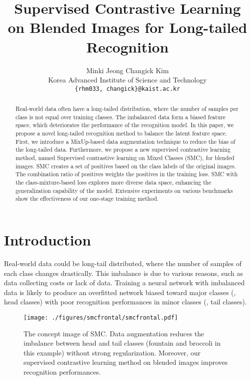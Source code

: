 \documentclass[10pt,twocolumn,letterpaper]{article}
\begin{document}
\title{Supervised Contrastive Learning on Blended Images for Long-tailed Recognition}

\author{Minki Jeong \quad Changick Kim\\
Korea Advanced Institute of Science and Technology\\
{\tt\small \{rhm033, changick\}@kaist.ac.kr}
}
\maketitle

\begin{abstract}
Real-world data often have a long-tailed distribution, where the number of samples per class is not equal over training classes. The imbalanced data form a biased feature space, which deteriorates the performance of the recognition model. In this paper, we propose a novel long-tailed recognition method to balance the latent feature space. First, we introduce a MixUp-based data augmentation technique to reduce the bias of the long-tailed data. Furthermore, we propose a new supervised contrastive learning method, named Supervised contrastive learning on Mixed Classes (SMC), for blended images. SMC creates a set of positives based on the class labels of the original images. The combination ratio of positives weights the positives in the training loss. SMC with the class-mixture-based loss explores more diverse data space, enhancing the generalization capability of the model. Extensive experiments on various benchmarks show the effectiveness of our one-stage training method.
\end{abstract}

\section{Introduction}
\label{SMCsec:intro}

Real-world data could be long-tail distributed, where the number of samples of each class changes drastically.
This imbalance is due to various reasons, such as data collecting costs or lack of data.
Training a neural network with imbalanced data is likely to produce an overfitted network biased toward major classes (\ie, head classes) with poor recognition performances in minor classes (\ie, tail classes).

\begin{figure}
    \centering
    \texttt{[image: ./figures/smcfrontal/smcfrontal.pdf]}
    \caption{The concept image of SMC. Data augmentation reduces the imbalance between head and tail classes (fountain and broccoli in this example) without strong regularization. Moreover, our supervised contrastive learning method on blended images improves recognition performances.
    }
    \label{SMCfig:frontal}
\end{figure}
\end{document}

